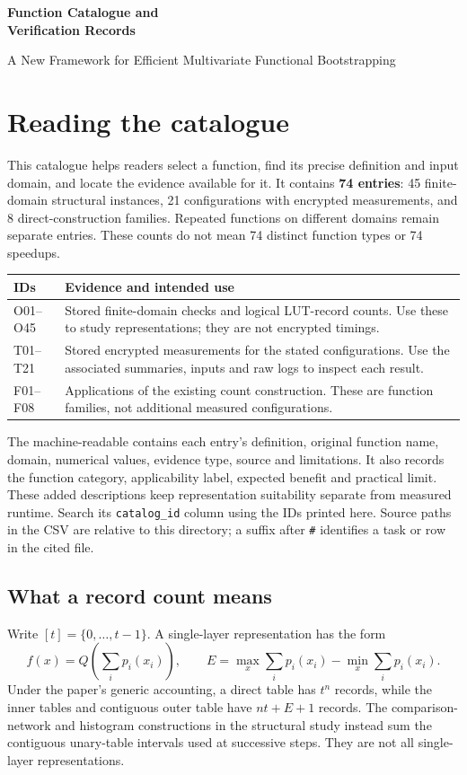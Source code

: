 \documentclass[a4paper,10pt]{article}
\newif\ifappmarked
\newcommand{\appadd}[1]{\ifappmarked{\color{blue}#1}\else#1\fi}
\begin{document}
\begin{center}
{\LARGE\bfseries Function Catalogue and\\[3pt] Verification Records}\par
\vspace{5pt}
{\large A New Framework for Efficient Multivariate Functional Bootstrapping}
\end{center}
\section{Reading the catalogue}
This catalogue helps readers select a function, find its precise definition and input domain, and locate the evidence available for it. It contains \textbf{74 entries}: 45 finite-domain structural instances, 21 configurations with encrypted measurements, and 8 direct-construction families. Repeated functions on different domains remain separate entries. These counts do not mean 74 distinct function types or 74 speedups.

\begin{center}
\begin{tabular}{@{}lp{119mm}@{}}
\toprule
IDs & Evidence and intended use\\\midrule
O01--O45 & Stored finite-domain checks and logical LUT-record counts. Use these to study representations; they are not encrypted timings.\\
T01--T21 & Stored encrypted measurements for the stated configurations. Use the associated summaries, inputs and raw logs to inspect each result.\\
F01--F08 & Applications of the existing count construction. These are function families, not additional measured configurations.\\
\bottomrule
\end{tabular}
\end{center}

The machine-readable  contains each entry's definition, original function name, domain, numerical values, evidence type, source and limitations. \appadd{It also records the function category, applicability label, expected benefit and practical limit. These added descriptions keep representation suitability separate from measured runtime.} Search its \texttt{catalog\_id} column using the IDs printed here. Source paths in the CSV are relative to this directory; a suffix after \texttt{\#} identifies a task or row in the cited file.

\subsection{What a record count means}
Write $[t]=\{0,\ldots,t-1\}$. A single-layer representation has the form
\[
 f(x)=Q\!\left(\sum_i p_i(x_i)\right),\qquad
 E=\max_x\sum_i p_i(x_i)-\min_x\sum_i p_i(x_i).
\]
Under the paper's generic accounting, a direct table has $t^n$ records, while the inner tables and contiguous outer table have $nt+E+1$ records. The comparison-network and histogram constructions in the structural study instead sum the contiguous unary-table intervals used at successive steps. They are not all single-layer representations.
\end{document}
